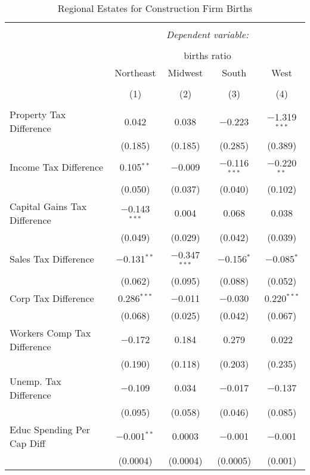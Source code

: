 
\begin{table}[!htbp] \centering 
  \caption{Regional Estates for  Construction Firm Births} 
  \label{} 
\begin{tabular}{@{\extracolsep{5pt}}lcccc} 
\\[-1.8ex]\hline 
\hline \\[-1.8ex] 
 & \multicolumn{4}{c}{\textit{Dependent variable:}} \\ 
\cline{2-5} 
\\[-1.8ex] & \multicolumn{4}{c}{births ratio} \\ 
 & Northeast & Midwest & South & West \\ 
\\[-1.8ex] & (1) & (2) & (3) & (4)\\ 
\hline \\[-1.8ex] 
 Property Tax Difference & 0.042 & 0.038 & $-$0.223 & $-$1.319$^{***}$ \\ 
  & (0.185) & (0.185) & (0.285) & (0.389) \\ 
  Income Tax Difference & 0.105$^{**}$ & $-$0.009 & $-$0.116$^{***}$ & $-$0.220$^{**}$ \\ 
  & (0.050) & (0.037) & (0.040) & (0.102) \\ 
  Capital Gains Tax Difference & $-$0.143$^{***}$ & 0.004 & 0.068 & 0.038 \\ 
  & (0.049) & (0.029) & (0.042) & (0.039) \\ 
  Sales Tax Difference & $-$0.131$^{**}$ & $-$0.347$^{***}$ & $-$0.156$^{*}$ & $-$0.085$^{*}$ \\ 
  & (0.062) & (0.095) & (0.088) & (0.052) \\ 
  Corp Tax Difference & 0.286$^{***}$ & $-$0.011 & $-$0.030 & 0.220$^{***}$ \\ 
  & (0.068) & (0.025) & (0.042) & (0.067) \\ 
  Workers Comp Tax Difference & $-$0.172 & 0.184 & 0.279 & 0.022 \\ 
  & (0.190) & (0.118) & (0.203) & (0.235) \\ 
  Unemp. Tax Difference & $-$0.109 & 0.034 & $-$0.017 & $-$0.137 \\ 
  & (0.095) & (0.058) & (0.046) & (0.085) \\ 
  Educ Spending Per Cap Diff & $-$0.001$^{**}$ & 0.0003 & $-$0.001 & $-$0.001 \\ 
  & (0.0004) & (0.0004) & (0.0005) & (0.001) \\ 

\end{tabular}
\end{table}
